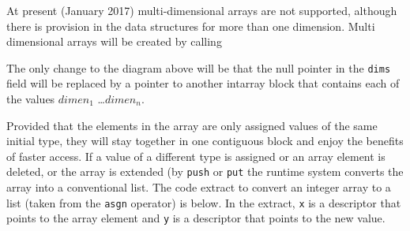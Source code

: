 At present (January 2017) multi-dimensional arrays are not supported,
although there is provision in the data structures for more than one
dimension. Multi dimensional arrays will be created by calling


The only change to the diagram above will be that the null pointer in the
\texttt{dims} field will be replaced by a pointer to another intarray block
that contains each of the values $dimen_1$ \dots $dimen_n$.

Provided that the elements in the array are only assigned values of the
same initial type, they will stay together in one contiguous block and
enjoy the benefits of faster access. If a value of a different type is
assigned or an array element is deleted, or the array is extended (by
\texttt{push} or \texttt{put} the runtime system converts the array into a
conventional list. The code extract to convert an integer array to a list
(taken from the \texttt{asgn} operator) is below.  In the extract,
\texttt{x} is a descriptor that points to the array element and \texttt{y}
is a descriptor that points to the new value.

\goodbreak
{}

